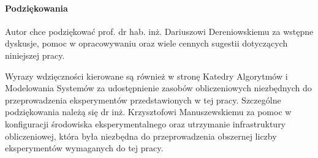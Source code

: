 \paragraph{Podziękowania}

Autor chce podziękować prof. dr hab. inż. Dariuszowi Dereniowskiemu za wstępne dyskusje, pomoc w opracowywaniu oraz wiele cennych sugestii dotyczących niniejszej pracy.

Wyrazy wdzięczności kierowane są również w stronę Katedry Algorytmów i Modelowania Systemów za udostępnienie zasobów obliczeniowych niezbędnych do przeprowadzenia eksperymentów przedstawionych w tej pracy. Szczególne podziękowania należą się dr inż. Krzysztofowi Manuszewskiemu za pomoc w konfiguracji środowiska eksperymentalnego oraz utrzymanie infrastruktury obliczeniowej, która była niezbędna do przeprowadzenia obszernej liczby eksperymentów wymaganych do tej pracy.

